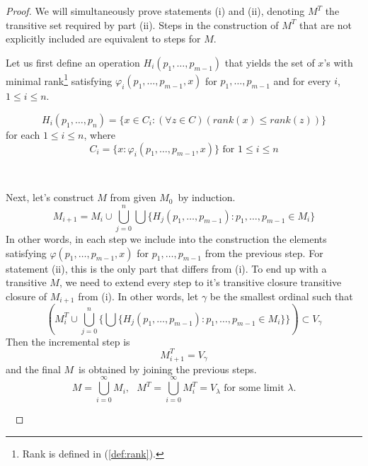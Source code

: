 \begin{proof}
We will simultaneously prove statements (i) and (ii), denoting $M^T$ the transitive set required by part (ii).
Steps in the construction of $M^T$ that are not explicitly included are equivalent to steps for $M$.

Let us first define an operation $H_i(p_1, \ldots, p_{m-1})$ that yields the set of $x$'s with minimal rank\footnote{Rank is defined in (\ref{def:rank}).} satisfying $\varphi_i(p_1, \ldots, p_{m-1}, x)$ for $p_1, \ldots, p_{m-1}$ and for every $i$, $1 \leq i \leq n$.

\begin{equation}
H_i(p_1, \ldots, p_n) = \{x \in C_i: (\forall z \in C)(rank(x) \leq rank(z))\}
\end{equation}
for each $1 \leq i \leq n$, where
\begin{equation}
C_i = \{x: \varphi_i(p_1, \ldots, p_{m-1}, x)\} \mbox{ for $1 \leq i \leq n$}
\end{equation}

\

Next, let's construct $M$ from given $M_0$ by induction. 
\begin{equation}
M_{i+1} = M_i \cup \bigcup_{j=0}^{n} \bigcup \{H_j(p_1, \ldots, p_{m-1}): p_1, \ldots, p_{m-1} \in M_i\}
\end{equation}
In other words, in each step we include into the construction the elements satisfying $\varphi(p_1, \ldots, p_{m-1}, x)$ for $p_1, \ldots, p_{m-1}$ from the previous step.
For statement (ii), this is the only part that differs from (i). To end up with a transitive $M$, we need to extend every step to it's transitive closure transitive closure of $M_{i+1}$ from (i). In other words, let $\gamma$ be the smallest ordinal such that 
\begin{equation}
(M^T_i \cup \bigcup_{j=0}^{n} \{\bigcup\{H_j(p_1, \ldots, p_{m-1}): p_1, \ldots, p_{m-1} \in M_i\}\}) \subset V_\gamma
\end{equation}
Then the incremental step is
\begin{equation}
M^T_{i+1} = V_\gamma
\end{equation}
and the final $M$ is obtained by joining the previous steps.
\begin{equation}
M = \bigcup_{i=0}^{\infty} M_i, \mbox{  }M^T = \bigcup_{i=0}^{\infty} M^T_i = V_\lambda\mbox{ for some limit }\lambda\mbox{.}
\end{equation}

\


\end{proof}
